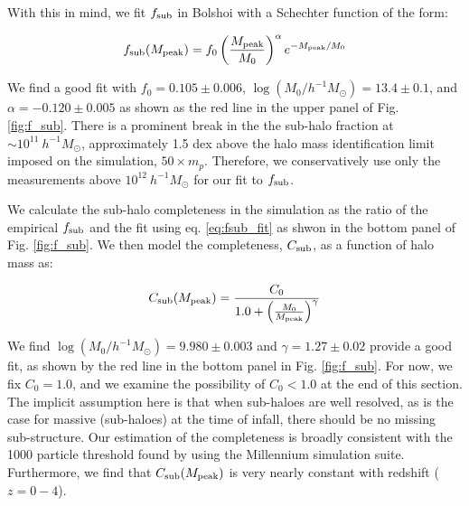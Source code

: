 \documentclass[a4paper,fleqn,usenatbib]{mnras}
\begin{document}
With this in mind, we fit $f_{\rm sub}$ in Bolshoi with a Schechter function of the form:
%
\begin{linenomath}
\begin{equation}
\label{eq:fsub_fit}
f_{\rm sub}(M_{\rm peak}) = f_0 \left( \frac{M_{\rm peak}}{M_0} \right)^{\alpha}e^{-M_{\rm peak}/M_0}
\end{equation}
\end{linenomath}
%
We find a good fit with $f_0 = 0.105 \pm 0.006$, $\log(M_0/h^{-1}M_{\odot}) = 13.4 \pm 0.1$, and $\alpha = -0.120 \pm 0.005$ as shown as the red line in the upper panel of Fig. \ref{fig:f_sub}.  There is a prominent break in the the sub-halo fraction at $\sim 10^{11} ~ h^{-1}M_{\odot}$, approximately 1.5 dex above the halo mass identification limit imposed on the simulation, $50 \times m_{p}$.  Therefore, we conservatively use only the measurements above $10^{12}~h^{-1}M_{\odot}$ for our fit to $f_{\rm sub}$.  

We calculate the sub-halo completeness in the simulation as the ratio of the empirical $f_{\rm sub}$ and the fit using eq. \ref{eq:fsub_fit} as shwon in the bottom panel of Fig. \ref{fig:f_sub}.  We then model the completeness, $C_{\rm sub}$, as a function of halo mass as:
%
\begin{linenomath}
\begin{equation}
\label{eq:sub_completeness}
C_{\rm sub}(M_{\rm peak}) = \frac{C_0}{1.0 + \left(\frac{M_0}{M_{\rm peak}}\right)^{\gamma}}
\end{equation}
\end{linenomath}
%
We find $\log(M_0/h^{-1}M_{\odot})=9.980\pm0.003$ and $\gamma=1.27 \pm 0.02$ provide a good fit, as shown by the red line in the bottom panel in Fig. \ref{fig:f_sub}.  For now, we fix $C_0=1.0$, and we examine the possibility of $C_0<1.0$ at the end of this section.  The implicit assumption here is that when sub-haloes are well resolved, as is the case for massive (sub-haloes) at the time of infall, there should be no missing sub-structure.  Our estimation of the completeness is broadly consistent with the 1000 particle threshold found by \citet{Guo:2013fm} using the Millennium simulation suite.  Furthermore, we find that $C_{\rm sub}(M_{\rm peak})$ is very nearly constant with redshift ($z=0-4$).  
\end{document}
